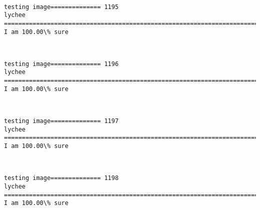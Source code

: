 \documentclass[11pt]{article}
\begin{document}
    \begin{center}
    \end{center}
    { \hspace*{\fill} \\}
    
    \begin{Verbatim}[commandchars=\\\{\}]
testing image============== 1195
lychee
============================================================================
I am 100.00\% sure

    \end{Verbatim}

    \begin{center}
    \end{center}
    { \hspace*{\fill} \\}
    
    \begin{Verbatim}[commandchars=\\\{\}]
testing image============== 1196
lychee
============================================================================
I am 100.00\% sure

    \end{Verbatim}

    \begin{center}
    \end{center}
    { \hspace*{\fill} \\}
    
    \begin{Verbatim}[commandchars=\\\{\}]
testing image============== 1197
lychee
============================================================================
I am 100.00\% sure

    \end{Verbatim}

    \begin{center}
    \end{center}
    { \hspace*{\fill} \\}
    
    \begin{Verbatim}[commandchars=\\\{\}]
testing image============== 1198
lychee
============================================================================
I am 100.00\% sure

    \end{Verbatim}
\end{document}
